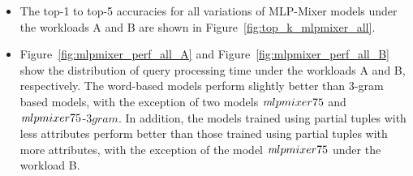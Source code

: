 \documentclass[conference]{IEEEtran}
\begin{document}
\begin{itemize}
	\item The top-1 to top-5 accuracies for all variations of MLP-Mixer models under the workloads A and B are shown in Figure~\ref{fig:top_k_mlpmixer_all}.
	\item Figure~\ref{fig:mlpmixer_perf_all_A} and Figure~\ref{fig:mlpmixer_perf_all_B} show the distribution of query processing time under the workloads A and B, respectively.
	The word-based models perform slightly better than 3-gram based models, with the exception of two models $\emph mlpmixer75$ and $\emph mlpmixer75$-$3gram$.
	In addition, the models trained using partial tuples with less attributes perform better than those trained using partial tuples with more attributes, 
	with the exception of the model $\emph mlpmixer75$ under the workload B.
\end{itemize}
\end{document}
